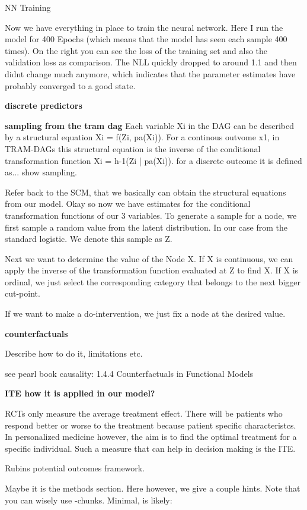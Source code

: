 NN Training

Now we have everything in place to train the neural network. Here I run the model for 400 Epochs (which means that the model has seen each sample 400 times). On the right you can see the loss of the training set and also the validation loss as comparison. The NLL quickly dropped to around 1.1 and then didnt change much anymore, which indicates that the parameter estimates have probably converged to a good state.


\textbf{discrete predictors}

\textbf{sampling from the tram dag}
Each variable Xi in the DAG can be described by a structural equation Xi = f(Zi, pa(Xi)). For a continous outvome x1, in TRAM-DAGs this structural equation is the inverse of the conditional transformation function Xi = h-1(Zi | pa(Xi)). for a discrete outcome it is defined as... show sampling.

Refer back to the SCM, that we basically can obtain the structural equations from our model. Okay so now we have estimates for the conditional transformation functions of our 3 variables. To generate a sample for a node, we first sample a random value from the latent distribution. In our case from the standard logistic. We denote this sample as Z.

Next we want to determine the value of the Node X. If X is continuous, we can apply the inverse of the transformation function evaluated at Z to find X. If X is ordinal, we just select the corresponding category that belongs to the next bigger cut-point.

If we want to make a do-intervention, we just fix a node at the desired value.


\textbf{counterfactuals}

Describe how to do it, limitations etc.

see pearl book causality: 1.4.4 Counterfactuals in Functional Models


\textbf{ITE how it is applied in our model?}

RCTs only measure the average treatment effect. There will be patients who respond better or worse to the treatment because patient specific characteristcs. In personalized medicine however, the aim is to find the optimal treatment for a specific individual. Such a measure that can help in decision making is the ITE.

Rubins potential outcomes framework.


Maybe it is the methods section. Here however, we give a couple hints.
Note that you can wisely use -chunks. Minimal, is likely: 

